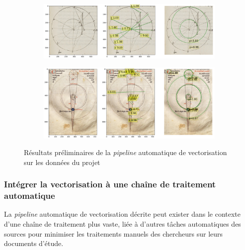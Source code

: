 	\begin{figure}[h]
		\hspace{1pt}
		\begin{subfigure}{1\linewidth}
			\centering
			\includegraphics[width=16cm]{images/imagine_vector1.png}
		\end{subfigure}
		\hspace{1pt}
		\begin{subfigure}{1\linewidth}
			\centering
			\includegraphics[width=16cm]{images/imagine_vector2.png}
		\end{subfigure}
		\caption{Résultats préliminaires de la \textit{pipeline} automatique de vectorisation sur les données du projet \eida}
		\label{fig:imagine_vector}
	\end{figure}

	\subsubsection{Intégrer la vectorisation à une chaîne de traitement automatique}
	La \textit{pipeline} automatique de vectorisation décrite peut exister dans le contexte d'une chaîne de traitement plus vaste, liée à d'autres tâches automatiques des sources pour minimiser les traitements manuels des chercheurs sur leurs documents d'étude. 
	
